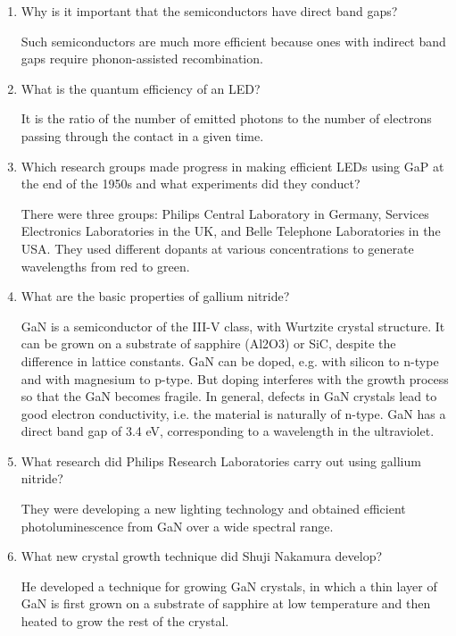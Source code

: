 \documentclass[a4paper, 12pt]{article}
\begin{document}
\begin{enumerate}[label=\alph*)]
	\item Why is it important that the semiconductors have direct band gaps?

		Such semiconductors are much more efficient because ones with 
		indirect band gaps require phonon-assisted recombination.

	\item What is the quantum efficiency of an LED?

		It is the ratio of the number of emitted photons to the number of 
		electrons passing through the contact in a given time.

	\item Which research groups made progress in making efficient LEDs using GaP at the end of the 1950s and what experiments did they conduct?

		There were three groups: Philips Central Laboratory in Germany, 
		Services Electronics Laboratories in the UK, and Belle Telephone 
		Laboratories in the USA. They used different dopants at various 
		concentrations to generate wavelengths from red to green.

	\item What are the basic properties of gallium nitride?

		GaN is a semiconductor of the III-V class, with Wurtzite crystal 
		structure. It can be grown on a substrate of sapphire (Al2O3) or 
		SiC, despite the difference in lattice constants. GaN can be doped, 
		e.g. with silicon to n-type and with magnesium to p-type. But doping 
		interferes with the growth process so that the GaN becomes fragile. 
		In general, defects in GaN crystals lead to good electron 
		conductivity, i.e. the material is naturally of n-type. GaN has 
		a direct band gap of 3.4 eV, corresponding to a wavelength in the 
		ultraviolet.

	\item What research did Philips Research Laboratories carry out using gallium nitride?

		They were developing a new lighting technology and obtained 
		efficient photoluminescence from GaN over a wide spectral range.

	\item What new crystal growth technique did Shuji Nakamura develop?

		He developed a technique for growing GaN crystals, in which a thin 
		layer of GaN is first grown on a substrate of sapphire at low 
		temperature and then heated to grow the rest of the crystal.


\end{enumerate}
\end{document}
